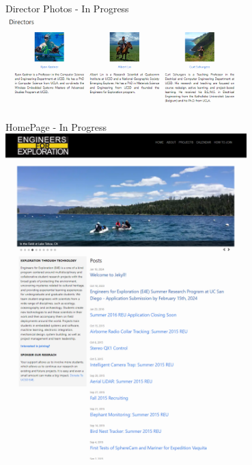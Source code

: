 \begin{frame}{Director Photos - In Progress}
    \centering
    \includegraphics[height=0.7\textheight,width=0.7\textwidth,keepaspectratio]{./images/326290539-4b1b66e6-6d6f-4a5c-b453-96dc81ab773b.png}
\end{frame}
\begin{frame}{HomePage - In Progress}
    \centering
    \includegraphics[height=0.7\textheight,width=0.7\textwidth,keepaspectratio]{./images/Screenshot 2024-04-29 123853.png}
\end{frame}




